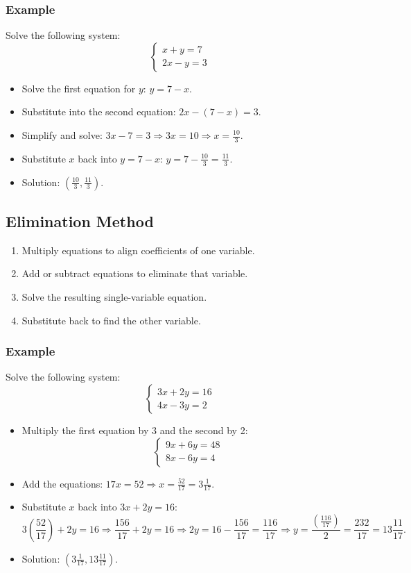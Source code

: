 \documentclass[12pt]{article}
\begin{document}
\subsubsection*{Example}
Solve the following system:
\[
\begin{cases}
x + y = 7 \\
2x - y = 3
\end{cases}
\]
\begin{itemize}
    \item Solve the first equation for \( y \): \( y = 7 - x \).
    \item Substitute into the second equation: \( 2x - (7 - x) = 3 \).
    \item Simplify and solve: \( 3x - 7 = 3 \Rightarrow 3x = 10 \Rightarrow x = \frac{10}{3} \).
    \item Substitute \( x \) back into \( y = 7 - x \): \( y = 7 - \frac{10}{3} = \frac{11}{3} \).
    \item Solution: \( \left( \frac{10}{3}, \frac{11}{3} \right) \).
\end{itemize}

\newpage

\subsection*{Elimination Method}
\begin{enumerate}
\item Multiply equations to align coefficients of one variable.
\item Add or subtract equations to eliminate that variable.
\item Solve the resulting single-variable equation.
\item Substitute back to find the other variable.
\end{enumerate}

\subsubsection*{Example}
Solve the following system:
\[
\begin{cases}
3x + 2y = 16 \\
4x - 3y = 2
\end{cases}
\]
\begin{itemize}
    \item Multiply the first equation by 3 and the second by 2: 
    \[
    \begin{cases}
    9x + 6y = 48 \\
    8x - 6y = 4
    \end{cases}
    \]
    \item Add the equations: $ 17x = 52 \Rightarrow x = \frac{52}{17} = 3\frac{1}{17}.$
    \item Substitute \( x \) back into \( 3x + 2y = 16 \): 
    \[
    3(\frac{52}{17}) + 2y = 16 \Rightarrow
    \frac{156}{17} + 2y = 16 \Rightarrow
    2y = 16 - \frac{156}{17} = \frac{116}{17} \Rightarrow
    y = \frac{(\frac{116}{17})}{2}=\frac{232}{17}=13\frac{11}{17}.
    \]
    \item Solution: \( (3\frac{1}{17}, 13\frac{11}{17}) \).
\end{itemize}
\end{document}
